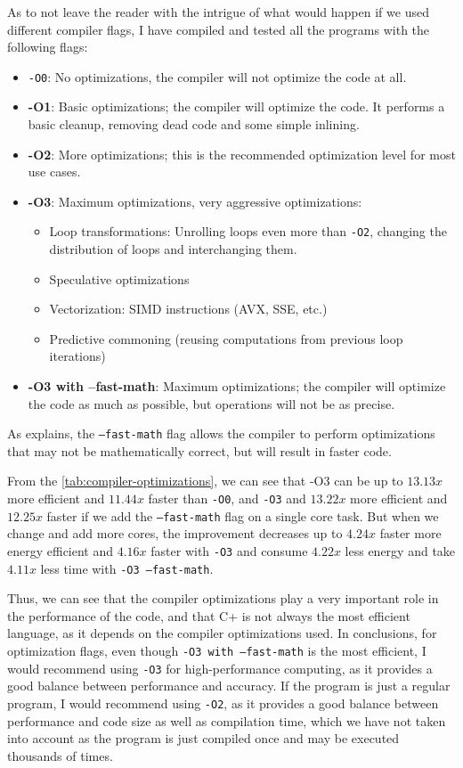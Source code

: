 As to not leave the reader with the intrigue of what would happen if we used different compiler flags, I have compiled and tested all the programs with the following flags:
\begin{itemize}
    \item \texttt{-O0}: No optimizations, the compiler will not optimize the code at all.
    \item \textbf{-O1}: Basic optimizations; the compiler will optimize the code. It performs a basic cleanup, removing dead code and some simple inlining.
    \item \textbf{-O2}: More optimizations; this is the recommended optimization level for most use cases.
    \item \textbf{-O3}: Maximum optimizations, very aggressive optimizations:
    \begin{itemize}
        \item Loop transformations: Unrolling loops even more than \texttt{-O2}, changing the distribution of loops and interchanging them.
        \item Speculative optimizations
        \item Vectorization: \gls{SIMD} instructions (AVX, SSE, etc.)
        \item Predictive commoning (reusing computations from previous loop iterations)
    \end{itemize}
    \item \textbf{-O3 with --fast-math}: Maximum optimizations; the compiler will optimize the code as much as possible, but operations will not be as precise.
\end{itemize}

As \autocite{llvm-fast-math} explains, the \texttt{--fast-math} flag allows the compiler to perform optimizations that may not be mathematically correct, but will result in faster code. 





From the \autoref{tab:compiler-optimizations}, we can see that -O3 can be up to $13.13x$ more efficient and $11.44x$ faster than \texttt{-O0}, and \texttt{-O3} and $13.22x$ more efficient and $12.25x$ faster if we add the \texttt{--fast-math} flag on a single core task. But when we change and add more cores, the improvement decreases up to $4.24x$ faster more energy efficient and $4.16x$ faster with \texttt{-O3} and consume $4.22x$ less energy and take $4.11x$ less time with \texttt{-O3 --fast-math}.

Thus, we can see that the compiler optimizations play a very important role in the performance of the code, and that C\++ is not always the most efficient language, as it depends on the compiler optimizations used. In conclusions, for optimization flags, even though \texttt{-O3 with --fast-math} is the most efficient, I would recommend using \texttt{-O3} for high-performance computing, as it provides a good balance between performance and accuracy. If the program is just a regular program, I would recommend using \texttt{-O2}, as it provides a good balance between performance and code size as well as compilation time, which we have not taken into account as the program is just compiled once and may be executed thousands of times.